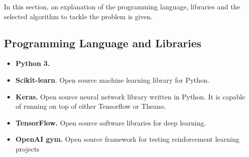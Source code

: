 In this section, an explanation of the programming language, libraries and the selected algorithm to tackle the problem is given.
\subsection{Programming Language and Libraries}
    \begin{itemize}
    \item \textbf{Python 3.}
    \item \textbf{Scikit-learn}. Open source machine learning library for Python.
    \item \textbf{Keras.} Open source neural network library written in Python. It is capable of
    running on top of either Tensorflow or Theano.
    \item \textbf{TensorFlow.} Open source software libraries for deep learning.
    \item \textbf{OpenAI gym.} Open source framework for testing reinforcement learning projects
    \end{itemize}
    
